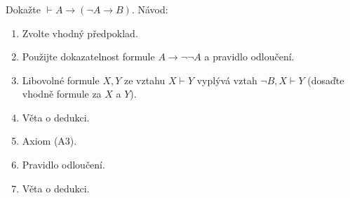 \subsubsection{}
Dokažte $\vdash A \rightarrow (\neg A \rightarrow B)$.
Návod:
\begin{enumerate}[1)]
	\item Zvolte vhodný předpoklad.
	\item Použijte dokazatelnost formule $A \rightarrow \neg\neg A$ a pravidlo odloučení.
	\item Libovolné formule $X,Y$ ze vztahu $X \vdash Y$ vyplývá vztah $\neg B, X \vdash Y$ (dosaďte vhodně formule za $X$ a $Y$).
	\item Věta o dedukci.
	\item Axiom (A3).
	\item Pravidlo odloučení.
	\item Věta o dedukci.
\end{enumerate}
